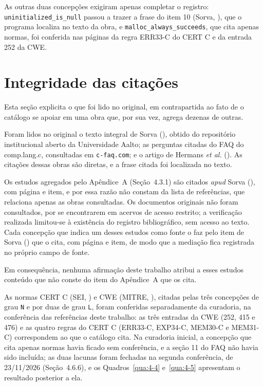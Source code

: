 As outras duas concepções exigiram apenas completar o registro: \texttt{uninitialized\_\allowbreak{}is\_\allowbreak{}null} passou a trazer a frase do item 10 (Sorva, \citeyear{sorva2012}), que o programa localiza no texto da obra, e \texttt{malloc\_\allowbreak{}always\_\allowbreak{}succeeds}, que cita apenas normas, foi conferida nas páginas da regra ERR33-C do CERT C e da entrada 252 da CWE.

\section{Integridade das citações}

Esta seção explicita o que foi lido no original, em contrapartida ao fato de o catálogo se apoiar em uma obra que, por sua vez, agrega dezenas de outras.

Foram lidos no original o texto integral de Sorva (\citeyear{sorva2012}), obtido do repositório institucional aberto da Universidade Aalto; as perguntas citadas do FAQ do comp.lang.c, consultadas em \texttt{c-{}faq.com}; e o artigo de Hermans \textit{et al.} (\citeyear{hermans2018}). As citações dessas obras são diretas, e a frase citada foi localizada no texto.

Os estudos agregados pelo Apêndice~A (Seção~4.3.1) são citados \textit{apud} Sorva (\citeyear{sorva2012}), com página e item, e por essa razão não constam da lista de referências, que relaciona apenas as obras consultadas. Os documentos originais não foram consultados, por se encontrarem em acervos de acesso restrito; a verificação realizada limitou-se à existência do registro bibliográfico, sem acesso ao texto. Cada concepção que indica um desses estudos como fonte o faz pelo item de Sorva (\citeyear{sorva2012}) que o cita, com página e item, de modo que a mediação fica registrada no próprio campo de fonte.

Em consequência, nenhuma afirmação deste trabalho atribui a esses estudos conteúdo que não conste do item do Apêndice~A que os cita.

As normas CERT C (SEI, \citeyear{sei2025}) e CWE (MITRE, \citeyear{mitre2026}), citadas pelas três concepções de grau \texttt{N} e por duas de grau \texttt{L}, foram conferidas separadamente da curadoria, na conferência das referências deste trabalho: as três entradas da CWE (252, 415 e 476) e as quatro regras do CERT C (ERR33-C, EXP34-C, MEM30-C e MEM31-C) correspondem ao que o catálogo cita. Na curadoria inicial, a concepção que cita apenas normas havia ficado sem conferência, e a seção 11 do FAQ não havia sido incluída; as duas lacunas foram fechadas na segunda conferência, de 23/11/2026 (Seção~4.6.6), e os Quadros~\ref{qua:4-4} e~\ref{qua:4-5} apresentam o resultado posterior a ela.

